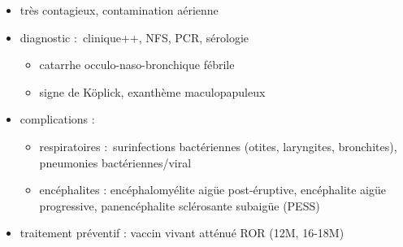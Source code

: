 \documentclass{article}
\begin{document}
\begin{itemize}
\item
  très contagieux, contamination aérienne
\item
  diagnostic :~clinique++, NFS, PCR, sérologie

  \begin{itemize}
  \item
    catarrhe occulo-naso-bronchique fébrile
  \item
    signe de Köplick, exanthème maculopapuleux
  \end{itemize}
\item
  complications :

  \begin{itemize}
  \item
    respiratoires :~surinfections bactériennes (otites, laryngites,
    bronchites), pneumonies bactériennes/viral
  \item
    encéphalites : encéphalomyélite aigüe post-éruptive, encéphalite
    aigüe progressive, panencéphalite sclérosante subaigüe (PESS)
  \end{itemize}
\item
  traitement préventif : vaccin vivant atténué ROR (12M, 16-18M)
\end{itemize}
\end{document}
